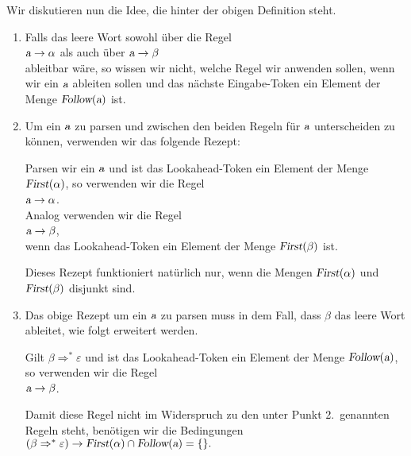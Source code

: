 \noindent
Wir diskutieren nun die Idee, die hinter der obigen Definition steht.
\begin{enumerate}
\item Falls das leere Wort sowohl \"uber die Regel
      \\[0.2cm]
      \hspace*{1.3cm}
      $\textsl{a} \rightarrow \alpha$ \quad als auch \"uber \quad $\textsl{a} \rightarrow \beta$
      \\[0.2cm]
      ableitbar w\"are, so wissen wir nicht, welche Regel wir anwenden sollen, wenn
      wir ein $\textsl{a}$ ableiten sollen und das n\"achste Eingabe-Token ein Element der Menge
      $\textsl{Follow}(\textsl{a})$ ist.
\item Um ein $\textsl{a}$ zu parsen und zwischen den beiden Regeln f\"ur $\textsl{a}$ unterscheiden zu k\"onnen,
      verwenden wir das folgende Rezept:

      Parsen wir ein $\textsl{a}$ und ist das Lookahead-Token ein Element der Menge
      $\textsl{First}(\alpha)$, so verwenden wir die Regel
      \\[0.2cm]
      \hspace*{1.3cm}
      $\textsl{a} \rightarrow \alpha$.
      \\[0.2cm]
      Analog verwenden wir die Regel
      \\[0.2cm]
      \hspace*{1.3cm}
      $\textsl{a} \rightarrow \beta$,
      \\[0.2cm]
      wenn das Lookahead-Token ein Element der Menge $\textsl{First}(\beta)$ ist.

      Dieses Rezept funktioniert nat\"urlich nur, wenn die Mengen $\textsl{First}(\alpha)$
      und $\textsl{First}(\beta)$ disjunkt sind.
\item Das obige Rezept um ein $\textsl{a}$ zu parsen muss in dem Fall, dass $\beta$ das leere Wort
      ableitet, wie folgt erweitert werden.
  
      Gilt $\beta \Rightarrow^* \varepsilon$ und ist das Lookahead-Token ein Element der
      Menge $\textsl{Follow}(\textsl{a})$, so verwenden wir die Regel
      \\[0.2cm]
      \hspace*{1.3cm}
      $\textsl{a} \rightarrow \beta$.
     
      Damit diese Regel nicht im Widerspruch zu den unter Punkt 2.~genannten Regeln steht,
      ben\"otigen wir die Bedingungen
      \\[0.2cm]
      \hspace*{1.3cm}
      $(\beta  \Rightarrow^* \varepsilon) \rightarrow \textsl{First}(\alpha) \cap \textsl{Follow}(\textsl{a}) = \{\}.$ 
\end{enumerate}
